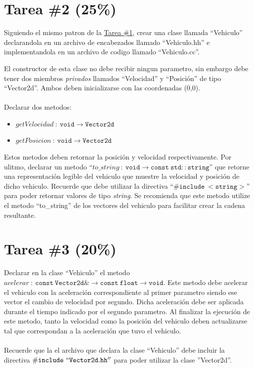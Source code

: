 \documentclass{article}
\begin{document}
\section*{Tarea \#2 (25\%)}
Siguiendo el mismo patron de la \href{sec:tarea1}{Tarea \#1}, crear una clase llamada
``Vehiculo'' declarandola en un archivo de encabezados llamado ``Vehiculo.hh'' e
implementandola en un archivo de codigo llamado ``Vehiculo.cc''.

El constructor de esta clase no debe recibir ningun parametro, sin embargo
debe tener dos miembros \emph{privados} llamados ``Velocidad'' y ``Posici\'on''
de tipo ``Vector2d''. Ambos deben inicializarse con las coordenadas (0,0).
\\\\
Declarar dos metodos:
\begin{itemize}
        \item{$getVelocidad\ :\ \mathtt{void}\rightarrow\mathtt{Vector2d}$}
        \item{$getPosicion\ :\ \mathtt{void}\rightarrow\mathtt{Vector2d}$}
\end{itemize}
Estos metodos deben retornar la posici\'on y velocidad respectivamente. Por ulitmo,
declarar un metodo ``$to\_string\ :\ \mathtt{void}\rightarrow \mathtt{const\ std::string}$'' que retorne una representaci\'on legible del
vehiculo que muestre la velocidad y posici\'on de dicho vehiculo. Recuerde que debe utilizar
la directiva ``$\mathtt{\#include\ <string>}$'' para poder retornar valores de tipo \emph{string}.
Se recomienda que este metodo utilize el metodo ``to\_string'' de los vectores del vehiculo
para facilitar crear la cadena resultante.

\section*{Tarea \#3 (20\%)}
Declarar en la clase ``Vehiculo'' el metodo $acelerar\ :\ \mathtt{const\ Vector2d\&}\rightarrow\mathtt{const\ float}\rightarrow \mathtt{void}$.
Este metodo debe acelerar el vehiculo con la aceleraci\'on correspondiente al primer
parametro siendo ese vector el cambio de velocidad por segundo. Dicha aceleraci\'on
debe ser aplicada durante el tiempo indicado por el segundo parametro. Al finalizar la
ejecuci\'on de este metodo, tanto la velocidad como la posici\'on del vehiculo deben
actualizarse tal que correspondan a la aceleraci\'on que tuvo el vehiculo.
\\\\
Recuerde que la el archivo que declara la clase ``Vehiculo'' debe incluir la
directiva $\mathtt{\#include\ ``Vector2d.hh''}$ para poder utilizar la clase
''Vector2d''.
\end{document}
